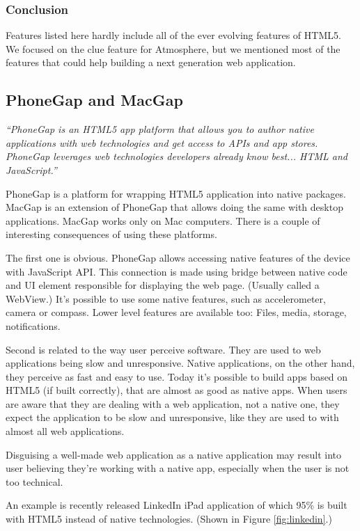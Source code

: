 \subsubsection{Conclusion}

Features listed here hardly include all of the ever evolving features of HTML5. We focused on the clue feature for Atmosphere, but we mentioned most of the features that could help building a next generation web application.

\subsection{PhoneGap and MacGap}

\emph{``PhoneGap is an HTML5 app platform that allows you to author native applications with web technologies and get access to APIs and app stores. PhoneGap leverages web technologies developers already know best... HTML and JavaScript.''} \citep{phonegap}

PhoneGap is a platform for wrapping HTML5 application into native packages. MacGap is an extension of PhoneGap that allows doing the same with desktop applications. MacGap works only on Mac computers.  There is a couple of interesting consequences of using these platforms.

The first one is obvious. PhoneGap allows accessing native features of the device with JavaScript API. This connection is made using bridge between native code and UI element responsible for displaying the web page. (Usually called a WebView.) It’s possible to use some native features, such as accelerometer, camera or compass. Lower level features are available too: Files, media, storage, notifications. 

Second is related to the way user perceive software. They are used to web applications being slow and unresponsive. Native applications, on the other hand, they perceive as fast and easy to use. Today it’s possible to build apps based on HTML5 (if built correctly), that are almost as good as native apps. When users are aware that they are dealing with a web application, not a native one, they expect the application to be slow and unresponsive, like they are used to with almost all web applications. 

Disguising a well-made web application as a native application may result into user believing they’re working with a native app, especially when the user is not too technical.

An example is recently released LinkedIn iPad application of which 95\% is built with HTML5 instead of native technologies. (Shown in Figure \ref{fig:linkedin}.) \citep{linkedin_ipad}

